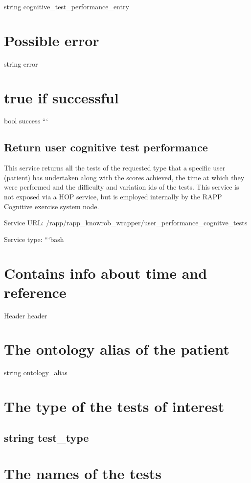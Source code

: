 string cognitive\-\_\-test\-\_\-performance\-\_\-entry \section*{Possible error}

string error \section*{true if successful}

bool success ```

\subsection*{Return user cognitive test performance}

This service returns all the tests of the requested type that a specific user (patient) has undertaken along with the scores achieved, the time at which they were performed and the difficulty and variation ids of the tests. This service is not exposed via a H\-O\-P service, but is employed internally by the R\-A\-P\-P Cognitive exercise system node.

Service U\-R\-L\-: {\ttfamily /rapp/rapp\-\_\-knowrob\-\_\-wrapper/user\-\_\-performance\-\_\-cognitve\-\_\-tests}

Service type\-: ```bash \section*{Contains info about time and reference}

Header header \section*{The ontology alias of the patient}

string ontology\-\_\-alias \section*{The type of the tests of interest}

\subsection*{string test\-\_\-type }

\section*{The names of the tests}

